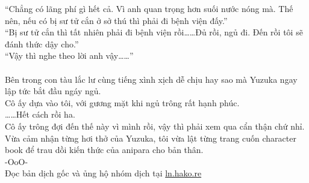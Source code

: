 \documentclass[12pt,a4paper, twosides]{book}
\begin{document}
“Chẳng có lãng phí gì hết cả. Vì anh quan trọng hơn suối nước nóng mà. Thế nên, nếu có bị sư tử cắn ở sở thú thì phải đi bệnh viện đấy.”\\
“Bị sư tử cắn thì tất nhiên phải đi bệnh viện rồi……Đủ rồi, ngủ đi. Đến rồi tôi sẽ đánh thức dậy cho.”\\
“Vậy thì nghe theo lời anh vậy……”\\
\\
Bên trong con tàu lắc lư cùng tiếng xình xịch dễ chịu hay sao mà Yuzuka ngay lập tức bắt đầu ngáy ngủ.\\
Cô ấy dựa vào tôi, với gương mặt khi ngủ trông rất hạnh phúc.\\
……Hết cách rồi ha.\\
Cô ấy trông đợi đến thế này vì mình rồi, vậy thì phải xem qua cẩn thận chứ nhỉ.\\
Vừa cảm nhận từng hơi thở của Yuzuka, tôi vừa lật từng trang cuốn character book để trau dồi kiến thức của anipara cho bản thân.\\
-OoO-\\
Đọc bản dịch gốc và ủng hộ nhóm dịch tại \href{https://ln.hako.re/}{ln.hako.re}\\
\newpage
\end{document}
